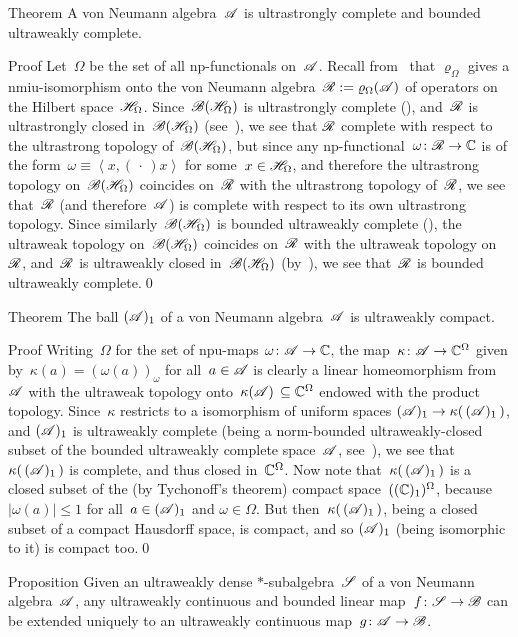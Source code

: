 \documentclass[a]{subfiles}
\begin{document}
\begin{parsec}%
\begin{point}[vn-complete]{Theorem}%
A von Neumann algebra~$\mathscr{A}$ is ultrastrongly complete
and bounded ultraweakly complete.
\begin{point}{Proof}%
Let~$\Omega$ be the set of all np-functionals
on~$\mathscr{A}$.
Recall from~
that $\varrho_\Omega$
gives a nmiu-isomorphism
onto the 
von Neumann algebra~$\mathscr{R}:=\varrho_\Omega(\mathscr{A})$ of operators
on the Hilbert space~$\mathscr{H}_\Omega$.
Since~$\mathscr{B}(\mathscr{H}_\Omega)$ is ultrastrongly complete
(),
and~$\mathscr{R}$ is  ultrastrongly closed in~$\mathscr{B}(\mathscr{H}_\Omega)$
(see~),
we see that $\mathscr{R}$
complete with respect to the ultrastrong
topology of~$\mathscr{B}(\mathscr{H}_\Omega)$,
but since any np-functional~$\omega\colon \mathscr{R}\to\mathbb{C}$
is of the form~$\omega\equiv \left<x,(\,\cdot\,)x\right>$
for some~$x\in\mathscr{H}_\Omega$,
and therefore  the ultrastrong topology on~$\mathscr{B}(\mathscr{H}_\Omega)$
coincides on~$\mathscr{R}$ with the ultrastrong topology of~$\mathscr{R}$,
we see that~$\mathscr{R}$ (and therefore~$\mathscr{A}$)
is complete with respect to its own ultrastrong topology.
Since similarly~$\mathscr{B}(\mathscr{H}_\Omega)$
is bounded ultraweakly complete (),
the ultraweak topology on~$\mathscr{B}(\mathscr{H}_\Omega)$
coincides on~$\mathscr{R}$ with the ultraweak topology on~$\mathscr{R}$,
and~$\mathscr{R}$ is ultraweakly closed
in~$\mathscr{B}(\mathscr{H}_\Omega)$
(by~),
we see that~$\mathscr{R}$ is bounded ultraweakly complete.\qed
\end{point}
\end{point}
\begin{point}{Theorem}%
The ball $(\mathscr{A})_1$
of a von Neumann algebra~$\mathscr{A}$ is ultraweakly compact.
\begin{point}{Proof}%
Writing~$\Omega$ for
the set of npu-maps $\omega\colon \mathscr{A}\to\mathbb{C}$,
the map~$\kappa\colon \mathscr{A}\to \mathbb{C}^\Omega$
given by~$\kappa(a)=(\omega(a))_\omega$ for all~$a\in\mathscr{A}$
is clearly a linear homeomorphism from~$\mathscr{A}$ with the  ultraweak topology 
onto~$\kappa(\mathscr{A})\,\subseteq \mathbb{C}^\Omega$ endowed
with the product topology.
Since~$\kappa$ restricts
to a isomorphism of uniform spaces
$(\mathscr{A})_1\to \kappa(\,(\mathscr{A})_1\,)$,
and $(\mathscr{A})_1$ is ultraweakly complete 
(being a norm-bounded ultraweakly-closed
subset of the bounded ultraweakly complete space~$\mathscr{A}$,
see~),
we see that $\kappa(\,(\mathscr{A})_1\,)$
is complete,
and thus closed in~$\mathbb{C}^\Omega$.
Now note that~$\kappa(\,(\mathscr{A})_1\,)$ is a closed subset 
of the (by Tychonoff's theorem) compact
space~$((\mathbb{C})_1)^\Omega$, 
because $\left|\omega(a)\right|\leq 1$ for all~$a\in(\mathscr{A})_1$
and $\omega\in\Omega$.
But then~$\kappa(\,(\mathscr{A})_1\,)$,
being a closed subset of a compact Hausdorff space,
is compact,
and so $(\mathscr{A})_1$ (being isomorphic to it) is compact too.\qed
\end{point}
\end{point}
\begin{point}[vn-extension]{Proposition}%
Given an ultraweakly dense $*$-subalgebra~$\mathscr{S}$
of a von Neumann algebra~$\mathscr{A}$,
any ultraweakly continuous and bounded linear map~$f\colon \mathscr{S}\to\mathscr{B}$
can be extended uniquely
to an ultraweakly continuous map~$g\colon \mathscr{A}\to\mathscr{B}$.


\end{point}
\end{parsec}
\end{document}
